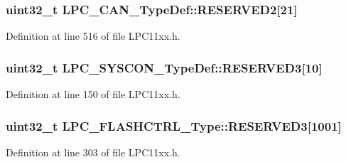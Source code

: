 \subsubsection[{\texorpdfstring{R\+E\+S\+E\+R\+V\+E\+D2}{RESERVED2}}]{\setlength{\rightskip}{0pt plus 5cm}uint32\+\_\+t L\+P\+C\+\_\+\+C\+A\+N\+\_\+\+Type\+Def\+::\+R\+E\+S\+E\+R\+V\+E\+D2\mbox{[}21\mbox{]}}\hypertarget{group___l_p_c11xx___definitions_gaccfdfc30dad1c391034d049062b2821b}{}\label{group___l_p_c11xx___definitions_gaccfdfc30dad1c391034d049062b2821b}


Definition at line 516 of file L\+P\+C11xx.\+h.

\subsubsection[{\texorpdfstring{R\+E\+S\+E\+R\+V\+E\+D3}{RESERVED3}}]{\setlength{\rightskip}{0pt plus 5cm}uint32\+\_\+t L\+P\+C\+\_\+\+S\+Y\+S\+C\+O\+N\+\_\+\+Type\+Def\+::\+R\+E\+S\+E\+R\+V\+E\+D3\mbox{[}10\mbox{]}}\hypertarget{group___l_p_c11xx___definitions_gab166232abfe71225f9b41a1400d6ffaa}{}\label{group___l_p_c11xx___definitions_gab166232abfe71225f9b41a1400d6ffaa}


Definition at line 150 of file L\+P\+C11xx.\+h.

\subsubsection[{\texorpdfstring{R\+E\+S\+E\+R\+V\+E\+D3}{RESERVED3}}]{ uint32\+\_\+t L\+P\+C\+\_\+\+F\+L\+A\+S\+H\+C\+T\+R\+L\+\_\+\+Type\+::\+R\+E\+S\+E\+R\+V\+E\+D3\mbox{[}1001\mbox{]}}\hypertarget{group___l_p_c11xx___definitions_ga5c05e98fac013cde1a119a3e91dde5d4}{}\label{group___l_p_c11xx___definitions_ga5c05e98fac013cde1a119a3e91dde5d4}


Definition at line 303 of file L\+P\+C11xx.\+h.


